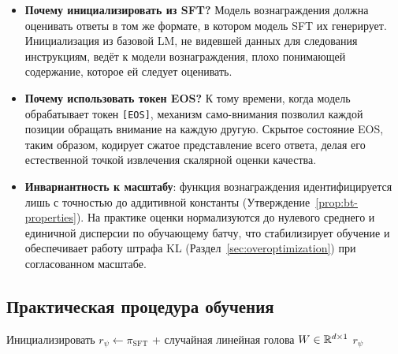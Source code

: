 \begin{itemize}[leftmargin=*]
  \item \textbf{Почему инициализировать из SFT?} Модель вознаграждения должна оценивать ответы в том же формате, в котором модель SFT их генерирует. Инициализация из базовой LM, не видевшей данных для следования инструкциям, ведёт к модели вознаграждения, плохо понимающей содержание, которое ей следует оценивать.
  \item \textbf{Почему использовать токен EOS?} К тому времени, когда модель обрабатывает токен \texttt{[EOS]}, механизм само-внимания позволил каждой позиции обращать внимание на каждую другую. Скрытое состояние EOS, таким образом, кодирует сжатое представление всего ответа, делая его естественной точкой извлечения скалярной оценки качества.
  \item \textbf{Инвариантность к масштабу}: функция вознаграждения идентифицируется лишь с точностью до аддитивной константы (Утверждение~\ref{prop:bt-properties}). На практике оценки нормализуются до нулевого среднего и единичной дисперсии по обучающему батчу, что стабилизирует обучение и обеспечивает работу штрафа KL (Раздел~\ref{sec:overoptimization}) при согласованном масштабе.
\end{itemize}

\subsection{Практическая процедура обучения}

\begin{algorithm}[ht]
\caption{Обучение модели вознаграждения по предпочтениям}
\label{alg:rm-training}
Инициализировать $r_\psi \leftarrow \pi_{\mathrm{SFT}}$ + случайная линейная голова $W \in \mathbb{R}^{d\times 1}$\;
\Return $r_\psi$
\end{algorithm}

